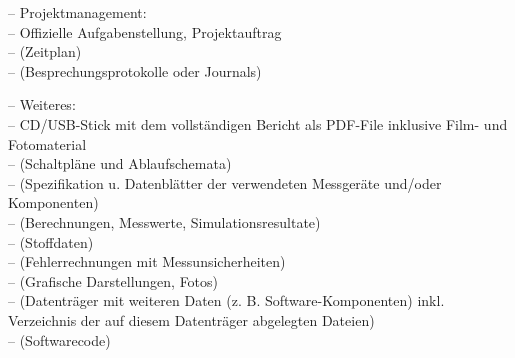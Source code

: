 \documentclass[%
  a4paper,
  twoside,
  numbers=noenddot,
  parskip=half+,
  open=any,
  headsepline,
  english, %
  ba  %
]{zhawthesis}
\begin{document}
\begin{appendices}
{  \quad -- Projektmanagement: \\ %
  \qquad -- Offizielle Aufgabenstellung, Projektauftrag \\ %
  \qquad -- (Zeitplan) \\ %
  \qquad -- (Besprechungsprotokolle oder Journals) %

  \quad -- Weiteres: \\ %
  \qquad -- CD/USB-Stick mit dem vollständigen Bericht als PDF-File inklusive Film- und Fotomaterial \\ %
  \qquad -- (Schaltpläne und Ablaufschemata) \\ %
  \qquad -- (Spezifikation u. Datenblätter der verwendeten Messgeräte und/oder Komponenten) \\ %
  \qquad -- (Berechnungen, Messwerte, Simulationsresultate) \\ %
  \qquad -- (Stoffdaten) \\ %
  \qquad -- (Fehlerrechnungen mit Messunsicherheiten) \\ %
  \qquad -- (Grafische Darstellungen, Fotos) \\ %
  \qquad -- (Datenträger mit weiteren Daten (z. B. Software-Komponenten) inkl. Verzeichnis der auf diesem Datenträger abgelegten Dateien) \\ %
  \qquad -- (Softwarecode) %
}

\end{appendices}
\end{document}

